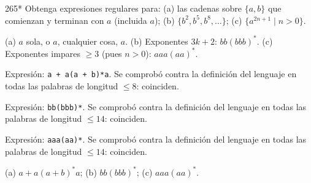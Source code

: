 \documentclass[11pt]{article}
\begin{document}
\begin{ejercicio}{265}{*}
Obtenga expresiones regulares para: (a) las cadenas sobre $\{a, b\}$ que comienzan y terminan con $a$ (incluida $a$); (b) $\{b^2, b^5, b^8, \ldots\}$; (c) $\{a^{2n+1} \mid n > 0\}$.
\end{ejercicio}
\proc (a) $a$ sola, o $a$, cualquier cosa, $a$. (b) Exponentes $3k + 2$: $bb(bbb)^*$. (c) Exponentes impares $\ge 3$ (pues $n > 0$): $aaa(aa)^*$.\par Expresión: \texttt{a + a(a + b)*a}. Se comprobó contra la definición del lenguaje en todas las palabras de longitud $\le 8$: coinciden.
\par Expresión: \texttt{bb(bbb)*}. Se comprobó contra la definición del lenguaje en todas las palabras de longitud $\le 14$: coinciden.
\par Expresión: \texttt{aaa(aa)*}. Se comprobó contra la definición del lenguaje en todas las palabras de longitud $\le 14$: coinciden.

\resp (a) $a + a(a + b)^*a$; (b) $bb(bbb)^*$; (c) $aaa(aa)^*$.
\end{document}
